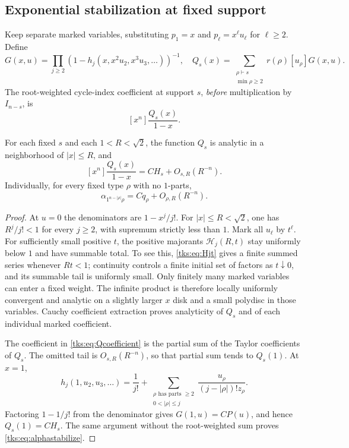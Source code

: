 \subsection{Exponential stabilization at fixed support}
Keep separate marked variables, substituting $p_1=x$ and $p_\ell=x^\ell u_\ell$ for $\ell\geq2$. Define
\[
G(x,u)=\prod_{j\geq2}(1-h_j(x,x^2u_2,x^3u_3,\ldots))^{-1},
\quad
Q_s(x)=\sum_{\substack{\rho\vdash s\\\min\rho\geq2}}
                r(\rho)[u_\rho]G(x,u).
\]
The root-weighted cycle-index coefficient at support $s$, \emph{before} multiplication by $I_{n-s}$, is
\begin{equation}\label{tks:eq:Qcoefficient}
[x^n]\frac{Q_s(x)}{1-x}.
\end{equation}

\begin{lemma}\label{tks:lem:stabilization}
For each fixed $s$ and each $1<R<\sqrt2$, the function $Q_s$ is analytic in a neighborhood of $|x|\leq R$, and
\begin{equation}\label{tks:eq:stabilize}
[x^n]\frac{Q_s(x)}{1-x}=CH_s+O_{s,R}(R^{-n}).
\end{equation}
Individually, for every fixed type $\rho$ with no $1$-parts,
\begin{equation}\label{tks:eq:alphastabilize}
\alpha_{1^{n-|\rho|}\rho}=Cq_\rho+O_{\rho,R}(R^{-n}).
\end{equation}
\end{lemma}
\begin{proof}
At $u=0$ the denominators are $1-x^j/j!$. For $|x|\leq R<\sqrt2$, one has $R^j/j!<1$ for every $j\geq2$, with supremum strictly less than $1$. Mark all $u_\ell$ by $t^\ell$. For sufficiently small positive $t$, the positive majorants $\mathcal H_j(R,t)$ stay uniformly below $1$ and have summable total. To see this, \eqref{tks:eq:Hjt} gives a finite summed series whenever $Rt<1$; continuity controls a finite initial set of factors as $t\downarrow0$, and its summable tail is uniformly small. Only finitely many marked variables can enter a fixed weight. The infinite product is therefore locally uniformly convergent and analytic on a slightly larger $x$ disk and a small polydisc in those variables. Cauchy coefficient extraction proves analyticity of $Q_s$ and of each individual marked coefficient.

The coefficient in \eqref{tks:eq:Qcoefficient} is the partial sum of the Taylor coefficients of $Q_s$. The omitted tail is $O_{s,R}(R^{-n})$, so that partial sum tends to $Q_s(1)$. At $x=1$,
\[
h_j(1,u_2,u_3,\ldots)=\frac1{j!}
 +\sum_{\substack{\rho\text{ has parts }\geq2\\0<|\rho|\leq j}}
                  \frac{u_\rho}{(j-|\rho|)!z_\rho}.
\]
Factoring $1-1/j!$ from the denominator gives $G(1,u)=CP(u)$, and hence $Q_s(1)=CH_s$. The same argument without the root-weighted sum proves \eqref{tks:eq:alphastabilize}.
\end{proof}

